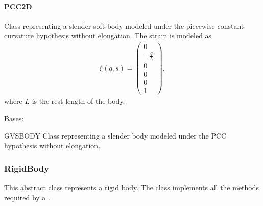 \documentclass[letterpaper,10pt,english]{sphinxmanual}
\begin{document}
\paragraph{PCC2D}
\label{\detokenize{PCC/pcc2d:pcc2d}}\label{\detokenize{PCC/pcc2d::doc}}\label{\detokenize{PCC/pcc2d:module-classes}}
\sphinxAtStartPar
Class representing a slender soft body modeled under the piecewise constant curvature hypothesis without elongation. The strain is modeled as
\begin{equation*}
\begin{split}\xi(q, s) = \left(\begin{array}{c} 0 \\ \displaystyle -\frac{q}{L} \\ 0 \\ 0 \\ 0 \\ 1  \end{array}\right),\end{split}
\end{equation*}
\sphinxAtStartPar
where \(L\) is the rest length of the body.

\begin{fulllineitems}
\label{\detokenize{PCC/pcc2d:PCC2D}}
\pysigstartsignatures
{}
\pysigstopsignatures
\sphinxAtStartPar
Bases: {\hyperref[\detokenize{gvsbody:GVSBody}]{}}

\sphinxAtStartPar
GVSBODY Class representing a slender body modeled under the PCC
hypothesis without elongation.

\end{fulllineitems}


\sphinxstepscope


\subsubsection{RigidBody}
\label{\detokenize{rigidbody:rigidbody}}\label{\detokenize{rigidbody::doc}}\label{\detokenize{rigidbody:module-classes}}
\sphinxAtStartPar
This abstract class represents a rigid body. The class implements all the methods required by a {\hyperref[\detokenize{body:Body}]{}}.
\end{document}
